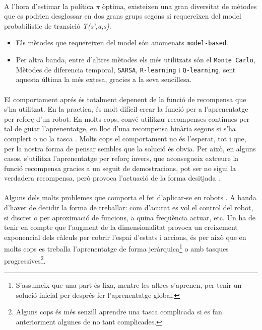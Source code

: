 \documentclass[12pt,a4paper,final,twoside]{article}
\begin{document}
\paragraph{}A l'hora d'estimar la política $\pi$ òptima, existeixen una gran diversitat de mètodes que es podrien desglossar en dos grans grups segons si requereixen del model probabilístic de transició \textit{T(s',a,s)}.

\begin{itemize}

\item Els mètodes que requereixen del model són anomenats \texttt{model-based}.

\item Per altra banda, entre d'altres mètodes els més utilitzats són el \texttt{Monte Carlo}, Mètodes de diferencia temporal, \texttt{SARSA}, \texttt{R-learning} i \texttt{Q-learning}, sent aquesta última la més extesa, gracies a la seva sencillesa.

\end{itemize}

\paragraph{}El comportament aprés és totalment depenent de la funció de recompensa que s'ha utilitzat. En la practica, és molt difícil crear la funció per a l'aprenentatge per reforç d'un robot. En molts cops, convé utilitzar recompenses continues per tal de guiar l'aprenentatge, en lloc d'una recompensa binària segons si s'ha complert o no la tasca \cite{Laud2004}. Molts cops el comportament no és l'esperat, tot i que, per la nostra forma de pensar sembles que la solució és obvia. Per això, en alguns casos, s'utilitza l'aprenentatge per reforç invers, que aconsegueix extreure la funció recompensa gracies a un seguit de demostracions, pot ser no sigui la verdadera recompensa, però provoca l'actuació de la forma desitjada \cite{Kober2009}.

\paragraph{}Alguns dels molts problemes que comporta el fet d'aplicar-se en robots \cite{Kober2009}. A banda d'haver de decidir la forma de treballar: com d'acurat es vol el control del robot, si discret o per aproximació de funcions, a quina freqüència actuar, etc. Un ha de tenir en compte que l'augment de la dimensionalitat provoca un creixement exponencial dels càlculs per cobrir l'espai d'estats i accions, és per això que en molts cops es treballa l'aprenentatge de forma jeràrquica\footnote{S'assumeix que una part és fixa, mentre les altres s'aprenen, per tenir un solució inicial per després fer l'aprenentatge global.} o amb tasques progressives\footnote{Alguns cops és més senzill aprendre una tasca complicada si es fan anteriorment algunes de no tant complicades.}. 
\end{document}
